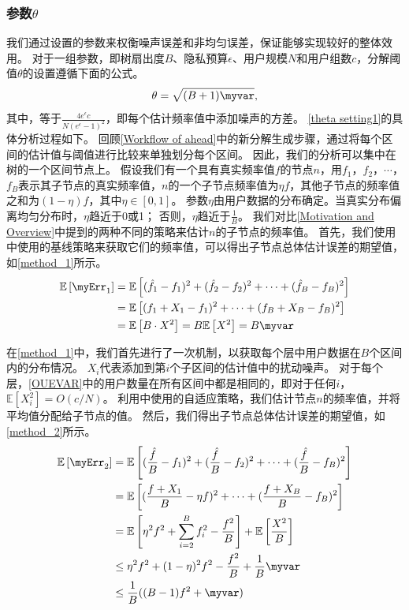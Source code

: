 \subsubsection{参数$\theta$}
我们通过设置\myahead 的参数来权衡噪声误差和非均匀误差，保证\myahead 能够实现较好的整体效用。
对于一组参数，即树扇出度$B$、隐私预算$\epsilon$、用户规模$N$和用户组数$c$，分解阈值$\theta$的设置遵循下面的公式。
\begin{equation}
    \theta = \sqrt{(B+1)\myvar}, 
    \label{theta setting1}
\end{equation}    
其中，\myvar 等于$\frac{4e^{\epsilon}c}{N\left(e^{\epsilon}-1\right)^{2}}$，即每个估计频率值中添加噪声的方差。
\autoref{theta setting1}的具体分析过程如下。
回顾\autoref{Workflow of ahead}中的新分解生成步骤，\myahead 通过将每个区间的估计值与阈值进行比较来单独划分每个区间。
因此，我们的分析可以集中在\myahead 树的一个区间节点上。
假设我们有一个具有真实频率值$f$的节点$n$，用$f_1$，$f_2$，$\cdots$，$f_B$表示其子节点的真实频率值，$n$的一个子节点频率值为$\eta f$，其他子节点的频率值之和为$(1-\eta)f$，其中$\eta \in [0,1]$。
参数$\eta$由用户数据的分布确定。当真实分布偏离均匀分布时，$\eta$趋近于0或1；
否则，$\eta$趋近于$\frac{1}{B}$。
我们对比\autoref{Motivation and Overview}中提到的两种不同的策略来估计$n$的子节点的频率值。
首先，我们使用\myhio 中使用的基线策略来获取它们的频率值，可以得出子节点总体估计误差的期望值，如\autoref{method_1}所示。
\begin{align}
    \mathbb{E}\left[\myErr_1\right] & = \mathbb{E}\left[(\hat{f_1} - f_1)^2 + (\hat{f_2} - f_2)^2 + \cdots + (\hat{f}_B - f_B)^2\right]        \nonumber \\
        & = \mathbb{E}\left[(f_1 + X_1 - f_1)^2 +  \cdots + (f_B + X_B - f_B)^2\right] \nonumber \\
        & = \mathbb{E}\left[B \cdot X^2\right] = B\mathbb{E}\left[X^2\right] = B\myvar
    \label{method_1}
\end{align}    

在\autoref{method_1}中，我们首先进行了一次\oue 机制，以获取每个层中用户数据在$B$个区间内的分布情况。
$X_i$代表添加到第$i$个子区间的估计值中的扰动噪声。
对于每个层，\autoref{OUEVAR}中的用户数量在所有区间中都是相同的，即对于任何$i$，$\mathbb{E}[X_i^2] = O(c/N)$。
利用\myahead 中使用的自适应策略，我们估计节点$n$的频率值，并将平均值分配给子节点的值。
然后，我们得出子节点总体估计误差的期望值，如\autoref{method_2}所示。
\begin{align}
    \mathbb{E}\left[\myErr_2\right] &= \mathbb{E}\left[ (\frac{\hat{f}}{B} - f_1)^2 + (\frac{\hat{f}}{B} - f_2)^2 + \cdots + (\frac{\hat{f}}{B} - f_B)^2 \right]  \nonumber \\
                & = \mathbb{E}\left[ (\frac{f+X_1}{B} - \eta f)^2 + \cdots + (\frac{f+X_B}{B} - f_B)^2 \right] \label{method_2_1} \\
                & = \mathbb{E}\left[ \eta^2 f^2 + \sum_{i=2}^B f_i^2 - \frac{f^2}{B}\right] + \mathbb{E}\left[\frac{X^2}{B} \right]  \nonumber \\
                & \leq \eta^2 f^2 + (1-\eta)^2f^2 - \frac{f^2}{B} + \frac{1}{B}\myvar \label{method_2_6} \\
                & \leq \frac{1}{B}((B-1)f^2+\myvar)
    \label{method_2}
\end{align}  

